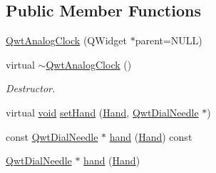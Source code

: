 \subsection*{Public Member Functions}
\begin{DoxyCompactItemize}
\item 
\hyperlink{class_qwt_analog_clock_af52a1110f1db89c162f49a23772745b9}{Qwt\-Analog\-Clock} (Q\-Widget $\ast$parent=N\-U\-L\-L)
\item 
virtual \hyperlink{class_qwt_analog_clock_a3abdcecf88e3d3510d94e96e7e9e74ee}{$\sim$\-Qwt\-Analog\-Clock} ()
\begin{DoxyCompactList}\small\item\em Destructor. \end{DoxyCompactList}\item 
virtual \hyperlink{group___u_a_v_objects_plugin_ga444cf2ff3f0ecbe028adce838d373f5c}{void} \hyperlink{class_qwt_analog_clock_a643101aafbe7a6fc91cb550203a7d3ee}{set\-Hand} (\hyperlink{class_qwt_analog_clock_acd8f7e963ae073120684de46821f2cfe}{Hand}, \hyperlink{class_qwt_dial_needle}{Qwt\-Dial\-Needle} $\ast$)
\item 
const \hyperlink{class_qwt_dial_needle}{Qwt\-Dial\-Needle} $\ast$ \hyperlink{class_qwt_analog_clock_ab390561b0856eef0d2bb80bdff0fb204}{hand} (\hyperlink{class_qwt_analog_clock_acd8f7e963ae073120684de46821f2cfe}{Hand}) const 
\item 
\hyperlink{class_qwt_dial_needle}{Qwt\-Dial\-Needle} $\ast$ \hyperlink{class_qwt_analog_clock_abb93bf8255bc00ef160165385bb6adce}{hand} (\hyperlink{class_qwt_analog_clock_acd8f7e963ae073120684de46821f2cfe}{Hand})
\end{DoxyCompactItemize}
